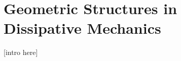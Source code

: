 \chapter{Geometric Structures in Dissipative Mechanics}
\label{chap:geometric_structures}

[intro here]






